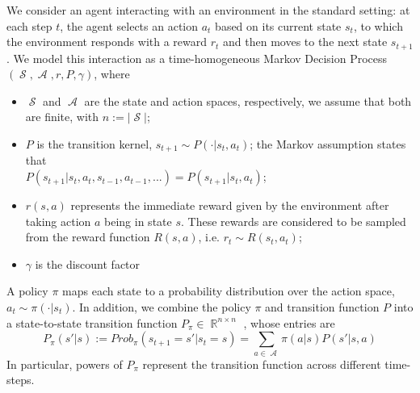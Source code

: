 \documentclass[12pt,a4paper,openright,twoside]{article}
\DeclareMathOperator*{\R}{\mathbb{R}}
\DeclareMathOperator*{\Sspace}{\mathcal{S}}
\DeclareMathOperator*{\A}{\mathcal{A}}
\numberwithin{equation}{section}
\theoremstyle{definition}
\theoremstyle{remark}
\theoremstyle{plain}
\begin{document}
We consider an agent interacting with an environment in the standard setting\cite{rlformulation}: at each step $t$, the agent selects an action $a_t$ based on its current state $s_t$, to which the environment responds with a reward $r_t$ and then moves to the next state $s_{t+1}$. We model this interaction as a time-homogeneous Markov Decision Process $(\Sspace, \A, r, P, \gamma)$, where
\begin{itemize}
    \item $\Sspace$ and $\A$ are the state and action spaces, respectively, we assume that both are finite, with $n:=|\Sspace|$;
    \item $P$ is the transition kernel, $s_{t+1} \sim P(\cdot | s_t,a_t)$; the Markov assumption states that \\ $P(s_{t+1} | s_t, a_t, s_{t-1}, a_{t-1}, ...) = P(s_{t+1} | s_t, a_t)$;
    \item $r(s,a)$ represents the immediate reward given by the environment after taking action $a$ being in state $s$. These rewards are considered to be sampled from the reward function $R(s,a)$, i.e. $r_t \sim R(s_t,a_t)$;
    \item $\gamma$ is the discount factor
\end{itemize}

A policy $\pi$ maps each state to a probability distribution over the action space, $a_t \sim \pi(\cdot | s_t)$. In addition, we combine the policy $\pi$ and transition function $P$ into a state-to-state transition function $P_\pi \in \R^{n \times n}$ , whose entries are
\begin{equation} \label{transitionFunction}
    P_{\pi} (s'|s) := Prob_\pi (s_{t+1}=s' | s_t = s) = \sum_{a\in\A} \pi(a|s)P(s'|s,a)
\end{equation}
In particular, powers of $P_\pi$ represent the transition function across different time-steps.
\end{document}
